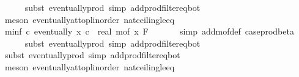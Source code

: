 \begin{isabellebody}
\ \ \ \ \isamarkupfalse%
\ {\isacharparenleft}{\kern0pt}subst\ eventually{\isacharunderscore}{\kern0pt}prod{}{\isacharprime}{\kern0pt}{\isacharcomma}{\kern0pt}\ simp\ add{\isacharcolon}{\kern0pt}prod{\isacharunderscore}{\kern0pt}filter{\isacharunderscore}{\kern0pt}eq{\isacharunderscore}{\kern0pt}bot{\isacharparenright}{\kern0pt}\isanewline
\ \ \ \ \isamarkupfalse%
\ {\isacharparenleft}{\kern0pt}meson\ eventually{\isacharunderscore}{\kern0pt}at{\isacharunderscore}{\kern0pt}top{\isacharunderscore}{\kern0pt}linorder\ nat{\isacharunderscore}{\kern0pt}ceiling{\isacharunderscore}{\kern0pt}le{\isacharunderscore}{\kern0pt}eq{\isacharparenright}{\kern0pt}\isanewline
\isanewline
\ \ \isamarkupfalse%
\ m{\isacharunderscore}{\kern0pt}inf{\isacharcolon}{\kern0pt}\ {\isachardoublequoteopen}{\isasymAnd}c{\isachardot}{\kern0pt}\ eventually\ {\isacharparenleft}{\kern0pt}{\isasymlambda}x{\isachardot}{\kern0pt}\ c\ {\isasymle}\ {\isacharparenleft}{\kern0pt}real\ {\isacharparenleft}{\kern0pt}m{\isacharunderscore}{\kern0pt}of\ x{\isacharparenright}{\kern0pt}{\isacharparenright}{\kern0pt}{\isacharparenright}{\kern0pt}\ {\isacharquery}{\kern0pt}F{\isachardoublequoteclose}\ \isanewline
\ \ \ \ \isamarkupfalse%
\ {\isacharparenleft}{\kern0pt}simp\ add{\isacharcolon}{\kern0pt}m{\isacharunderscore}{\kern0pt}of{\isacharunderscore}{\kern0pt}def\ case{\isacharunderscore}{\kern0pt}prod{\isacharunderscore}{\kern0pt}beta{\isacharprime}{\kern0pt}{\isacharparenright}{\kern0pt}\isanewline
\ \ \ \ \isamarkupfalse%
\ {\isacharparenleft}{\kern0pt}subst\ eventually{\isacharunderscore}{\kern0pt}prod{}{\isacharprime}{\kern0pt}{\isacharcomma}{\kern0pt}\ simp\ add{\isacharcolon}{\kern0pt}prod{\isacharunderscore}{\kern0pt}filter{\isacharunderscore}{\kern0pt}eq{\isacharunderscore}{\kern0pt}bot{\isacharparenright}{\kern0pt}\isanewline
\ \ \ \ \isamarkupfalse%
\ {\isacharparenleft}{\kern0pt}subst\ eventually{\isacharunderscore}{\kern0pt}prod{}{\isacharprime}{\kern0pt}{\isacharcomma}{\kern0pt}\ simp\ add{\isacharcolon}{\kern0pt}prod{\isacharunderscore}{\kern0pt}filter{\isacharunderscore}{\kern0pt}eq{\isacharunderscore}{\kern0pt}bot{\isacharparenright}{\kern0pt}\isanewline
\ \ \ \ \isamarkupfalse%
\ {\isacharparenleft}{\kern0pt}meson\ eventually{\isacharunderscore}{\kern0pt}at{\isacharunderscore}{\kern0pt}top{\isacharunderscore}{\kern0pt}linorder\ nat{\isacharunderscore}{\kern0pt}ceiling{\isacharunderscore}{\kern0pt}le{\isacharunderscore}{\kern0pt}eq{\isacharparenright}{\kern0pt}\isanewline

\end{isabellebody}
